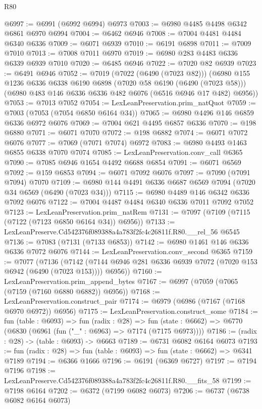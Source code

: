 \begin{lexlean}{R80}
\begin{coremodule}
@6997 := @6991 (@6992 @6994) @6973
@7003 := @6980 @4485 @4498 @6342 @6861 @6970 @6994
@7004 := @6462 @6946
@7008 := @7004 @4481 @4484 @6340 @6336
@7009 := @6071 @6939
@7010 := @6191 @6898
@7011 := @7009 @7010
@7013 := @7008 @7011 @6970
@7019 := @6980 @283 @4483 @6336 @6339 @6939 @7010
@7020 := @6485 @6946
@7022 := @7020 @82 @6939
@7023 := @6491 @6946
@7052 := @7019
    (@7022 (@6490 (@7023 @82)))
    (@6980
      @155
      @1236
      @6336
      @6338
      @6190
      @6898
      (@7020 @58 @6190 (@6490 (@7023 @58)))
      (@6980 @483 @146 @6336 @6336 @482 @6076 (@6516 @6946 @17 @482) @6956))
@7053 := @7013 @7052
@7054 := LexLeanPreservation.prim_natQuot
@7059 := @7003 (@7053 (@7054 @6850 @6164 @34))
@7065 := @6980 @4496 @146 @6859 @6336 @6972 @6076
@7069 := @7004 @621 @4495 @6857 @6336
@7070 := @198 @6880
@7071 := @6071 @7070
@7072 := @198 @6882
@7074 := @6071 @7072 @6076
@7077 := @7069 (@7071 @7074) @6972
@7083 := @6980 @4493 @1463 @6855 @6338 @7070 @7074
@7085 := LexLeanPreservation.conv_call @6365
@7090 := @7085 @6946 @1654 @4492 @6688 @6854
@7091 := @6071 @6569
@7092 := @159 @6853
@7094 := @6071 @7092 @6076
@7097 := @7090 (@7091 @7094) @7070
@7109 := @6980 @144 @4491 @6336 @6687 @6569 @7094 (@7020 @34 @6569 (@6490 (@7023 @34)))
@7115 := @6980 @4489 @146 @6342 @6336 @7092 @6076
@7122 := @7004 @4487 @4484 @6340 @6336 @7011 @7092 @7052
@7123 := LexLeanPreservation.prim_natRem
@7131 := @7097 (@7109 (@7115 (@7122 (@7123 @6850 @6164 @34)) @6956))
@7133 := LexLeanPreserve.Cd542376f089388a4a783f2fc4c26811f.R80.__rel_56 @6545
@7136 := @7083 (@7131 (@7133 @6853))
@7142 := @6980 @1461 @146 @6336 @6336 @7072 @6076
@7144 := LexLeanPreservation.conv_second @6365
@7159 := @7077
    (@7136
      (@7142 (@7144 @6946 @281 @6336 @6939 @7072 (@7020 @153 @6942 (@6490 (@7023 @153)))) @6956))
@7160 := LexLeanPreservation.prim_append_bytes
@7167 := @6997 (@7059 (@7065 (@7159 (@7160 @6880 @6882)) @6956))
@7168 := LexLeanPreservation.construct_pair
@7174 := @6979 (@6986 (@7167 (@7168 @6970 @6972)) @6956)
@7175 := LexLeanPreservation.construct_some
@7184 := fun (table : @6093) =>
  fun (radix : @28) =>
  fun (state : @6662) => @6770 (@6830 (@6961 (fun ("_" : @6963) => @7174 (@7175 @6973))))
@7186 := (radix : @28) -> (table : @6093) -> @6663
@7189 := @6731 @6082 @6164 @6073
@7193 := fun (radix : @28) => fun (table : @6093) => fun (state : @6662) => @6341 @7189
@7194 := @6366 @1666
@7196 := @6191 (@6369 @6727)
@7197 := @7194 @7196
@7198 := LexLeanPreserve.Cd542376f089388a4a783f2fc4c26811f.R80.__fits_58
@7199 := @7198 @6164
@7202 := @6372 (@7199 @6082 @6073)
@7206 := @6737 (@6738 @6082 @6164 @6073)

\end{coremodule}
\end{lexlean}
